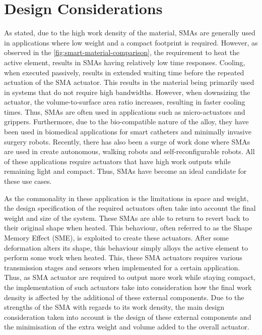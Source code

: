 \section*{Design Considerations}
As stated, due to the high work density of the material, SMAs are generally used in applications where low weight and a compact footprint is required. However, as observed in the \cref{fig:smart-material-comparison}, the requirement to heat the active element, results in SMAs having relatively low time responses. Cooling, when executed passively, results in extended waiting time before the repeated actuation of the SMA actuator. This results in the material being primarily used in systems that do not require high bandwidths. However, when downsizing the actuator, the volume-to-surface area ratio increases, resulting in faster cooling times. Thus, SMAs are often used in applications such as micro-actuators and grippers. Furthermore, due to the bio-compatible nature of the alloy, they have been used in biomedical applications for smart catheters and minimally invasive surgery robots. Recently, there has also been a surge of work done where SMAs are used in create autonomous, walking robots and self-reconfigurable robots. All of these applications require actuators that have high work outputs while remaining light and compact. Thus, SMAs have become an ideal candidate for these use cases.

As the commonality in these application is the limitations in space and weight, the design specification of the required actuators often take into account the final weight and size of the system. These SMAs are able to return to revert back to their original shape when heated. This behaviour, often referred to as the Shape Memory Effect (SME), is exploited to create these actuators. After some deformation alters its shape, this behaviour simply alloys the active element to perform some work when heated. This, these SMA actuators requires various transmission stages and sensors when implemented for a certain application. Thus, as SMA actuator are required to output more work while staying compact, the implementation of such actuators take into consideration how the final work density is affected by the additional of these external components. Due to the strengths of the SMA with regards to its work density, the main design consideration taken into account is the design of these external components and the minimisation of the extra weight and volume added to the overall actuator.

